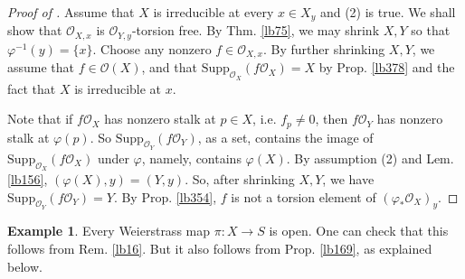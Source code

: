 \documentclass[12pt,b5paper,notitlepage]{report}
\theoremstyle{definition}
\newtheorem{eg}[df]{Example}
\theoremstyle{plain}
\newtheorem{lm}[df]{Lemma}
\DeclareMathOperator{\sann}{\mathscr{A}\text{\kern -3pt {\calligra\large nn}}\,}
\newcommand{\scr}{\mathscr}
\newcommand{\Supp}{\mathrm{Supp}}
\numberwithin{equation}{section}
\begin{document}
\begin{proof}[Proof of ]
Assume that $X$ is irreducible at every $x\in X_y$ and (2) is true. We shall show that $\scr O_{X,x}$ is $\scr O_{Y,y}$-torsion free. By Thm. \ref{lb75}, we may shrink $X,Y$ so that $\varphi^{-1}(y)=\{x\}$. Choose any nonzero $f\in\scr O_{X,x}$. By further shrinking $X,Y$, we assume that $f\in\scr O(X)$, and that $\Supp_{\scr O_X}(f\scr O_X)=X$ by Prop. \ref{lb378} and the fact that $X$ is irreducible at $x$. 



Note that if $f\scr O_X$ has nonzero stalk at $p\in X$, i.e. $f_p\neq 0$, then $f\scr O_Y$ has nonzero stalk at $\varphi(p)$. So $\Supp_{\scr O_Y}(f\scr O_Y)$, as a set, contains the image of $\Supp_{\scr O_X}(f\scr O_X)$ under $\varphi$, namely, contains $\varphi(X)$. By assumption (2) and Lem. \ref{lb156}, $(\varphi(X),y)=(Y,y)$. So, after shrinking $X,Y$, we have $\Supp_{\scr O_Y}(f\scr O_Y)=Y$. By Prop. \ref{lb354}, $f$ is not a torsion element of $(\varphi_*\scr O_X)_y$.
\end{proof}


\begin{comment}
\begin{lm}
Let $\varphi:X\rightarrow Y$ be a finite morphism of complex space. Let $\scr E$ be a coherent $\scr O_X$-module. Then the following identity for complex spaces hold:
\begin{align}
\Supp_{\scr O_Y}(\varphi_*\scr E)=\varphi(\Supp_{\scr O_X}\scr E)
\end{align}
\end{lm}


\begin{proof}
Let $g\in\scr O_Y$. Then $g\in\sann_{\scr O_Y}(\varphi_*\scr E)$ iff $g\circ\varphi$ annihilates $\scr E$, iff $g\circ\varphi\in\sann_{\scr O_X}(\scr E)$, iff $g\circ\varphi$ annihilates $\scr O_{\Supp_{\scr O_X}(\scr E)}=\scr O_X/\sann_{\scr O_X}(\scr E)$, iff $g\in\sann_{\scr O_Y}(\varphi_*\scr O_{\Supp_{\scr O_X}(\scr E)})$.
\end{proof}
\end{comment}

\begin{eg}\label{lb205}
Every Weierstrass map $\pi:X\rightarrow S$ is open. One can check that this follows from Rem. \ref{lb16}. But it also follows from Prop. \ref{lb169}, as explained below.
\end{eg}
\end{document}
